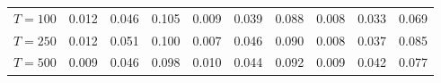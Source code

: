 % 
\begin{tabular}{cccccccccc}
  \hline
  \hline
$T = 100$ & 0.012 & 0.046 & 0.105 & 0.009 & 0.039 & 0.088 & 0.008 & 0.033 & 0.069 \\ 
  $T = 250$ & 0.012 & 0.051 & 0.100 & 0.007 & 0.046 & 0.090 & 0.008 & 0.037 & 0.085 \\ 
  $T = 500$ & 0.009 & 0.046 & 0.098 & 0.010 & 0.044 & 0.092 & 0.009 & 0.042 & 0.077 \\ 
   \hline
\end{tabular}
